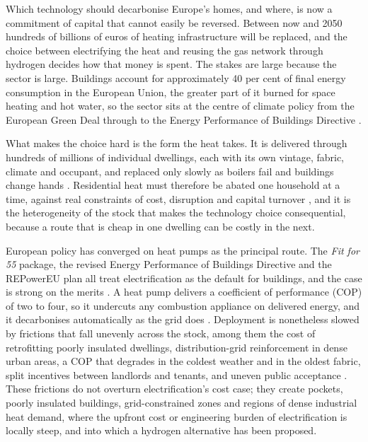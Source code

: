 
Which technology should decarbonise Europe's homes, and where, is now a commitment of
capital that cannot easily be reversed. Between now and 2050 hundreds of billions of
euros of heating infrastructure will be replaced, and the choice between electrifying
the heat and reusing the gas network through hydrogen decides how that money is spent.
The stakes are large because the sector is large. Buildings account for approximately 40
per cent of final energy consumption in the European Union, the greater part of it
burned for space heating and hot water, so the sector sits at the centre of climate
policy from the European Green Deal through to the Energy Performance of Buildings
Directive \citep{IEA2022buildings,EuropeanCommission2020GreenDeal}.

What makes the choice hard is the form the heat takes. It is delivered through hundreds
of millions of individual dwellings, each with its own vintage, fabric, climate and
occupant, and replaced only slowly as boilers fail and buildings change hands
\citep{Azevedo2022, Chatterjee2024Navigating}. Residential heat must therefore be abated
one household at a time, against real constraints of cost, disruption and capital
turnover \citep{Maia2024Household, Arbulu2022Barriers}, and it is the heterogeneity of
the stock that makes the technology choice consequential, because a route that is cheap
in one dwelling can be costly in the next.

European policy has converged on heat pumps as the principal route. The
\emph{Fit for 55} package, the revised Energy Performance of Buildings Directive
and the REPowerEU plan all treat electrification as the default for buildings,
and the case is strong on the merits \citep{REpowerEU2022,EPBD2024}.
A heat pump delivers a coefficient of performance (COP) of two to four, so it
undercuts any combustion appliance on delivered energy, and it decarbonises
automatically as the grid does \citep{IEA2022heatpumps,Abbasi2021}.
Deployment is nonetheless slowed by frictions that fall unevenly across the
stock, among them the cost of retrofitting poorly insulated dwellings, distribution-grid
reinforcement in dense urban areas, a COP that degrades in
the coldest weather and in the oldest fabric, split incentives between landlords
and tenants, and uneven public acceptance
\citep{Lingard2020Residential,Gordon2023Divergent}. These
frictions do not overturn electrification's cost case; they create pockets,
poorly insulated buildings, grid-constrained zones and regions of dense
industrial heat demand, where the upfront cost or engineering burden of
electrification is locally steep, and into which a hydrogen alternative has been
proposed.

